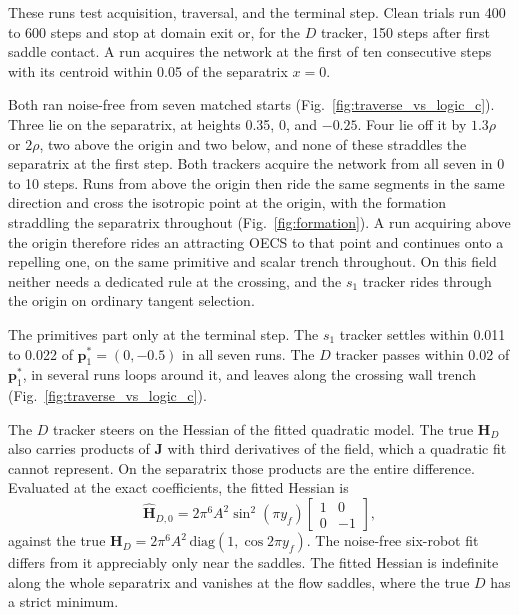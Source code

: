 \documentclass[lettersize,journal]{IEEEtran}
\begin{document}
These runs test acquisition, traversal, and the terminal step. Clean trials
run 400 to 600 steps and stop at domain exit or, for the $D$ tracker,
150 steps after first saddle contact. A run acquires the network at the first of ten
consecutive steps with its centroid within 0.05 of the separatrix $x = 0$.

Both ran noise-free from seven matched starts
(Fig.~\ref{fig:traverse_vs_logic_c}). Three lie on the separatrix, at heights 0.35, 0, and $-0.25$. Four lie off it by $1.3\rho$ or $2\rho$, two above the origin and two below, and none of these straddles the separatrix at the first step. Both trackers acquire the network from all seven in 0 to 10 steps. Runs from above the origin then ride the same segments in the same direction and cross the isotropic point at the origin, with the formation straddling the separatrix throughout (Fig.~\ref{fig:formation}). A run
acquiring above the origin therefore rides an attracting OECS to that
point and continues onto a repelling one, on the same primitive and scalar
trench throughout. On this field neither needs a dedicated rule at the
crossing, and the $s_1$ tracker rides through the origin on ordinary
tangent selection.

The primitives part only at the terminal step. The $s_1$ tracker settles
within 0.011 to 0.022 of $\mathbf{p}^*_1 = (0, -0.5)$ in all seven runs.
The $D$ tracker passes within 0.02 of $\mathbf{p}^*_1$, in several runs
loops around it, and leaves along the crossing wall trench
(Fig.~\ref{fig:traverse_vs_logic_c}).

The $D$ tracker steers on the Hessian of the fitted quadratic model. The
true $\mathbf{H}_D$ also carries products of $\mathbf{J}$ with third
derivatives of the field, which a quadratic fit cannot represent. On the
separatrix those products are the entire difference. Evaluated at the exact
coefficients, the fitted Hessian is
\begin{equation}
    \hat{\mathbf{H}}_{D,0} = 2\pi^6 A^2 \sin^2(\pi y_f)
    \begin{bmatrix} 1 & 0 \\ 0 & -1 \end{bmatrix},
    \label{eq:hess_fit_sep}
\end{equation}
against the true $\mathbf{H}_D = 2\pi^6 A^2\,\mathrm{diag}(1, \cos 2\pi y_f)$.
The noise-free six-robot fit differs from it
appreciably only near the saddles. The fitted Hessian is indefinite along
the whole separatrix and vanishes at the flow saddles, where the true $D$
has a strict minimum.
\end{document}
